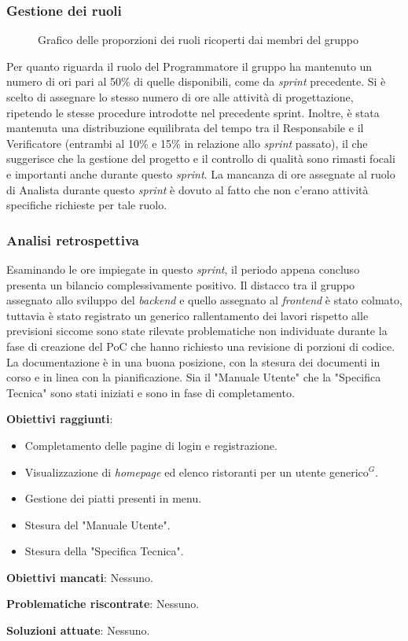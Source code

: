 \subsubsection{Gestione dei ruoli}
\begin{figure}[h]
	\centering
	\caption{Grafico delle proporzioni dei ruoli ricoperti dai membri del gruppo}
\end{figure}

Per quanto riguarda il ruolo del Programmatore il gruppo ha mantenuto un numero di ori pari al 50\% di quelle disponibili, come da \textit{sprint} precedente.
Si è scelto di assegnare lo stesso numero di ore alle attività di progettazione, ripetendo le stesse procedure introdotte nel precedente sprint.
Inoltre, è stata mantenuta una distribuzione equilibrata del tempo tra il Responsabile e il Verificatore (entrambi al 10\% e 15\% in relazione allo \textit{sprint} passato), il che suggerisce che la gestione del progetto e il controllo di qualità sono rimasti focali e importanti anche durante questo \textit{sprint}.
La mancanza di ore assegnate al ruolo di Analista durante questo \textit{sprint} è dovuto al fatto che non c'erano attività specifiche richieste per tale ruolo.


\subsubsection{Analisi retrospettiva}
Esaminando le ore impiegate in questo \textit{sprint}, il periodo appena concluso presenta un bilancio complessivamente positivo.
Il distacco tra il gruppo assegnato allo sviluppo del \textit{backend} e quello assegnato al \textit{frontend} è stato colmato, tuttavia è stato registrato un generico rallentamento dei lavori rispetto alle previsioni siccome sono state rilevate problematiche non individuate durante la fase di creazione del PoC che hanno richiesto una revisione di porzioni di codice.\\
La documentazione è in una buona posizione, con la stesura dei documenti in corso e in linea con la pianificazione. Sia il "Manuale Utente" che la "Specifica Tecnica" 
sono stati iniziati e sono in fase di completamento.

\textbf{Obiettivi raggiunti}:
\begin{itemize}
	\item Completamento delle pagine di login e registrazione.
	\item Visualizzazione di \textit{homepage} ed elenco ristoranti per un utente generico$^G$.
	\item Gestione dei piatti presenti in menu.
	\item Stesura del "Manuale Utente".
	\item Stesura della "Specifica Tecnica".
\end{itemize}

\textbf{Obiettivi mancati}: Nessuno.

\textbf{Problematiche riscontrate}: Nessuno.

\textbf{Soluzioni attuate}: Nessuno.